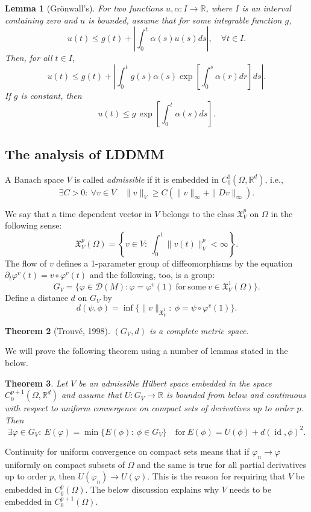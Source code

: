 \documentclass[a5paper,10pt,twoside]{article}
\newcommand{\R}{\ensuremath{\mathbb{R}}}
\newcommand{\cD}{\ensuremath{\mathcal{D}}}
\newcommand{\X}{\ensuremath{\mathfrak{X}}}
\DeclareMathOperator*{\id}{id}
\theoremstyle{plain}
\newtheorem{teo}{Theorem}[section]
\newtheorem{lem}[teo]{Lemma}
\theoremstyle{definition}
\theoremstyle{remark}
\begin{document}
\begin{lem}[Grönwall's]
	\label{gronwalls}
	For two functions $u,\alpha:I\to \R$, where $I$ is an interval containing zero and $u$ is bounded, assume that for some integrable function $g$,
	\[
	u(t)\leq g(t)+\left|\int_0^t\alpha(s)u(s)ds\right|,\quad \forall t\in I.
	\]
	Then, for all $t\in I$,
	\[
	u(t)\leq g(t)+\left|\int_0^t g(s)\alpha(s)\exp[\int_0^s\alpha(r)dr]ds\right|.
	\]
	If $g$ is constant, then
	\[
	u(t)\leq g\,\exp\left[\int_0^t\alpha(s)ds\right].
	\]
\end{lem}

\subsection{The analysis of LDDMM}

A Banach space $V$ is called \textit{admissible} if it is embedded in $C_0^1(\Omega,\R^d)$, i.e., 
\[
	\exists C>0: \ \forall v\in V\quad \|v\|_V\geq C(\|v\|_\infty+\|Dv\|_\infty).
\]

We say that a time dependent vector in $V$ belongs to the class $\X_V^p$ on $\Omega$ in the following sense:
\[
\X_V^p(\Omega)=\left\{v\in V:\ \int_0^1\|v(t)\|_V^p<\infty\right\}.
\]
The flow of $v$ defines a 1-parameter group of diffeomorphisms by the equation $\partial_t\varphi^v(t)=v\circ\varphi^v(t)$ and the following, too, is a group:
\[
G_V=\{\varphi\in \cD(M): \varphi=\varphi^v(1)\ \mathrm{for\ some\ } v\in\X_V^1(\Omega)\}.
\]
Define a distance $d$ on $G_V$ by
\[
d(\psi,\phi)=\inf\{\|v\|_{\X_V^1}:\ \phi=\psi\circ\varphi^v(1)\}.
\]

\begin{teo}[Trouvé, 1998]
	$(G_V,d)$ is a complete metric space.
\end{teo}


We will prove the following theorem using a number of lemmas stated in the below.

\begin{teo}
\label{teo:minimizerLDDMM}
	Let $V$ be an admissible Hilbert space embedded in the space $C_0^{p+1}(\Omega,\R^d)$ and assume that $U:G_V\to\R$ is bounded from below and continuous with respect to uniform convergence on compact sets of derivatives up to order $p$. Then
	\[
	\exists \varphi\in G_V:\ E(\varphi)=\min\{E(\phi):\ \phi\in G_V\}\quad \mathrm{for\ } E(\phi)=U(\phi)+d(\id,\phi)^2.
	\]
\end{teo}

Continuity for uniform convergence on compact sets means that if $\varphi_n\to\varphi$ uniformly on compact subsets of $\Omega$ and the same is true for all partial derivatives up to order $p$, then $U(\varphi_n)\to U(\varphi)$. This is the reason for requiring that $V$ be embedded in $C_0^p(\Omega)$. 
The below discussion explains why $V$ needs to be embedded in $C^{p+1}_0(\Omega)$.
\end{document}
